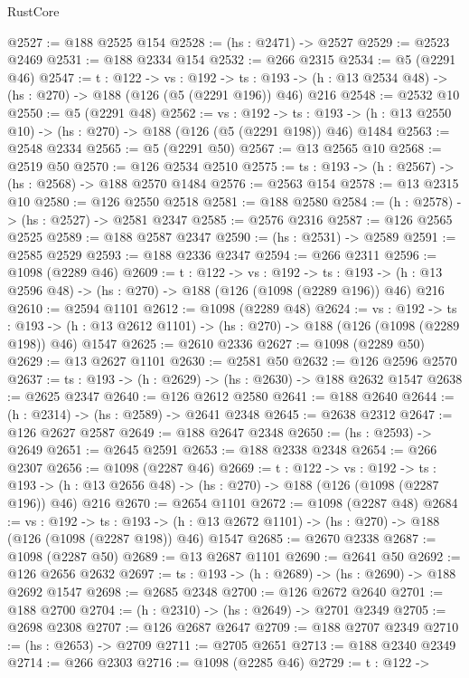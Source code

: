 \begin{lexlean}{RustCore}
\begin{coremodule}
@2527 := @188 @2525 @154
@2528 := (hs : @2471) -> @2527
@2529 := @2523 @2469
@2531 := @188 @2334 @154
@2532 := @266 @2315
@2534 := @5 (@2291 @46)
@2547 := {t : @122} ->
  {vs : @192} ->
  {ts : @193} -> (h : @13 @2534 @48) -> (hs : @270) -> @188 (@126 (@5 (@2291 @196)) @46) @216
@2548 := @2532 @10
@2550 := @5 (@2291 @48)
@2562 := {vs : @192} ->
  {ts : @193} -> (h : @13 @2550 @10) -> (hs : @270) -> @188 (@126 (@5 (@2291 @198)) @46) @1484
@2563 := @2548 @2334
@2565 := @5 (@2291 @50)
@2567 := @13 @2565 @10
@2568 := @2519 @50
@2570 := @126 @2534 @2510
@2575 := {ts : @193} -> (h : @2567) -> (hs : @2568) -> @188 @2570 @1484
@2576 := @2563 @154
@2578 := @13 @2315 @10
@2580 := @126 @2550 @2518
@2581 := @188 @2580
@2584 := (h : @2578) -> (hs : @2527) -> @2581 @2347
@2585 := @2576 @2316
@2587 := @126 @2565 @2525
@2589 := @188 @2587 @2347
@2590 := (hs : @2531) -> @2589
@2591 := @2585 @2529
@2593 := @188 @2336 @2347
@2594 := @266 @2311
@2596 := @1098 (@2289 @46)
@2609 := {t : @122} ->
  {vs : @192} ->
  {ts : @193} -> (h : @13 @2596 @48) -> (hs : @270) -> @188 (@126 (@1098 (@2289 @196)) @46) @216
@2610 := @2594 @1101
@2612 := @1098 (@2289 @48)
@2624 := {vs : @192} ->
  {ts : @193} -> (h : @13 @2612 @1101) -> (hs : @270) -> @188 (@126 (@1098 (@2289 @198)) @46) @1547
@2625 := @2610 @2336
@2627 := @1098 (@2289 @50)
@2629 := @13 @2627 @1101
@2630 := @2581 @50
@2632 := @126 @2596 @2570
@2637 := {ts : @193} -> (h : @2629) -> (hs : @2630) -> @188 @2632 @1547
@2638 := @2625 @2347
@2640 := @126 @2612 @2580
@2641 := @188 @2640
@2644 := (h : @2314) -> (hs : @2589) -> @2641 @2348
@2645 := @2638 @2312
@2647 := @126 @2627 @2587
@2649 := @188 @2647 @2348
@2650 := (hs : @2593) -> @2649
@2651 := @2645 @2591
@2653 := @188 @2338 @2348
@2654 := @266 @2307
@2656 := @1098 (@2287 @46)
@2669 := {t : @122} ->
  {vs : @192} ->
  {ts : @193} -> (h : @13 @2656 @48) -> (hs : @270) -> @188 (@126 (@1098 (@2287 @196)) @46) @216
@2670 := @2654 @1101
@2672 := @1098 (@2287 @48)
@2684 := {vs : @192} ->
  {ts : @193} -> (h : @13 @2672 @1101) -> (hs : @270) -> @188 (@126 (@1098 (@2287 @198)) @46) @1547
@2685 := @2670 @2338
@2687 := @1098 (@2287 @50)
@2689 := @13 @2687 @1101
@2690 := @2641 @50
@2692 := @126 @2656 @2632
@2697 := {ts : @193} -> (h : @2689) -> (hs : @2690) -> @188 @2692 @1547
@2698 := @2685 @2348
@2700 := @126 @2672 @2640
@2701 := @188 @2700
@2704 := (h : @2310) -> (hs : @2649) -> @2701 @2349
@2705 := @2698 @2308
@2707 := @126 @2687 @2647
@2709 := @188 @2707 @2349
@2710 := (hs : @2653) -> @2709
@2711 := @2705 @2651
@2713 := @188 @2340 @2349
@2714 := @266 @2303
@2716 := @1098 (@2285 @46)
@2729 := {t : @122} ->

\end{coremodule}
\end{lexlean}
